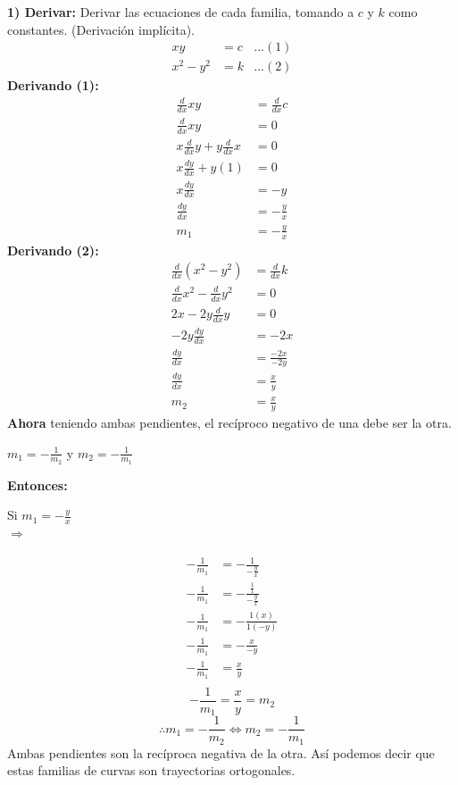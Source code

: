 \newline
\textbf{1) Derivar:} Derivar las ecuaciones de cada familia, tomando a $c$ y $k$ como constantes. (Derivación implícita).
\begin{align*}
   xy &= c           &... (1)\\
   x^{2} - y^{2} &= k              &...(2)
\end{align*}
\newline
\textbf{Derivando (1):}
\begin{align*}
    \frac{d}{dx}xy &= \frac{d}{dx}c \\
    \frac{d}{dx}xy &= 0 \\
    x\frac{d}{dx}y  +  y\frac{d}{dx}x &= 0 \\
    x\frac{dy}{dx} +  y(1) &= 0 \\
    x\frac{dy}{dx}  &= -y \\
    \frac{dy}{dx}  &= -\frac{y}{x}\\
    m_{1}  &= -\frac{y}{x}
\end{align*}
\newline
\textbf{Derivando (2):}
\begin{align*}
    \frac{d}{dx}(x^{2} - y^{2}) &= \frac{d}{dx}k \\
    \frac{d}{dx}x^{2} -  \frac{d}{dx}y^{2} &= 0\\
    2x -  2y\frac{d}{dx}y &= 0\\
    -2y\frac{dy}{dx} &= -2x\\
    \frac{dy}{dx} &= \frac{-2x}{-2y}\\
    \frac{dy}{dx} &= \frac{x}{y}\\
    m_{2}  &= \frac{x}{y}
\end{align*}
\newline
\textbf{Ahora} teniendo ambas pendientes, el recíproco negativo de una debe ser la otra. \\
\begin{center}
    $ m_{1}  = -\frac{1}{m_{2}}$      y    $ m_{2}  = -\frac{1}{m_{1}}$\\
\end{center}
\textbf{Entonces:}
\begin{center}
    Si $ m_{1}  = -\frac{y}{x} $ \\
    $\Rightarrow$ 
\end{center}
\begin{align*}
   -\frac{1}{m_{1}} &= -\frac{1}{-\frac{y}{x}}\\
   -\frac{1}{m_{1}} &= -\frac{\frac{1}{1}}{-\frac{y}{x}}\\
   -\frac{1}{m_{1}} &= -\frac{1(x)}{1(-y)}\\
   -\frac{1}{m_{1}} &= -\frac{x}{-y}\\
   -\frac{1}{m_{1}} &= \frac{x}{y}\\
\end{align*}
\[
  -\frac{1}{m_{1}} = \frac{x}{y} = m_{2}
\]
\[
\therefore  m_{1}  = -\frac{1}{m_{2}}   \Leftrightarrow   m_{2}  = -\frac{1}{m_{1}}
\]
\newline
Ambas pendientes son la recíproca negativa de la otra. Así podemos decir que estas familias de curvas son trayectorias ortogonales.